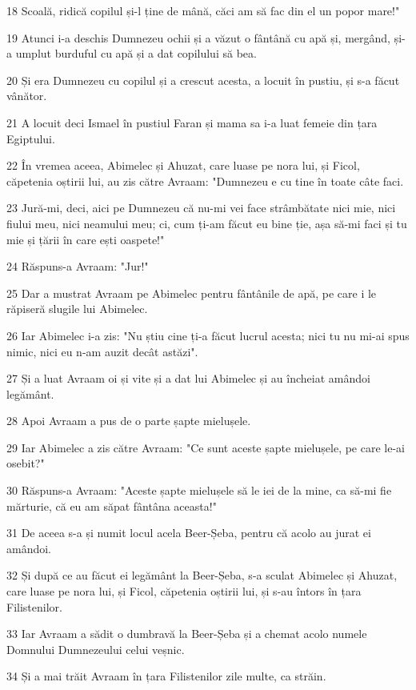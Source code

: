 \par 18 Scoală, ridică copilul și-l ține de mână, căci am să fac din el un popor mare!"
\par 19 Atunci i-a deschis Dumnezeu ochii și a văzut o fântână cu apă și, mergând, și-a umplut burduful cu apă și a dat copilului să bea.
\par 20 Și era Dumnezeu cu copilul și a crescut acesta, a locuit în pustiu, și s-a făcut vânător.
\par 21 A locuit deci Ismael în pustiul Faran și mama sa i-a luat femeie din țara Egiptului.
\par 22 În vremea aceea, Abimelec și Ahuzat, care luase pe nora lui, și Ficol, căpetenia oștirii lui, au zis către Avraam: "Dumnezeu e cu tine în toate câte faci.
\par 23 Jură-mi, deci, aici pe Dumnezeu că nu-mi vei face strâmbătate nici mie, nici fiului meu, nici neamului meu; ci, cum ți-am făcut eu bine ție, așa să-mi faci și tu mie și țării în care ești oaspete!"
\par 24 Răspuns-a Avraam: "Jur!"
\par 25 Dar a mustrat Avraam pe Abimelec pentru fântânile de apă, pe care i le răpiseră slugile lui Abimelec.
\par 26 Iar Abimelec i-a zis: "Nu știu cine ți-a făcut lucrul acesta; nici tu nu mi-ai spus nimic, nici eu n-am auzit decât astăzi".
\par 27 Și a luat Avraam oi și vite și a dat lui Abimelec și au încheiat amândoi legământ.
\par 28 Apoi Avraam a pus de o parte șapte mielușele.
\par 29 Iar Abimelec a zis către Avraam: "Ce sunt aceste șapte mielușele, pe care le-ai osebit?"
\par 30 Răspuns-a Avraam: "Aceste șapte mielușele să le iei de la mine, ca să-mi fie mărturie, că eu am săpat fântâna aceasta!"
\par 31 De aceea s-a și numit locul acela Beer-Șeba, pentru că acolo au jurat ei amândoi.
\par 32 Și după ce au făcut ei legământ la Beer-Șeba, s-a sculat Abimelec și Ahuzat, care luase pe nora lui, și Ficol, căpetenia oștirii lui, și s-au întors în țara Filistenilor.
\par 33 Iar Avraam a sădit o dumbravă la Beer-Șeba și a chemat acolo numele Domnului Dumnezeului celui veșnic.
\par 34 Și a mai trăit Avraam în țara Filistenilor zile multe, ca străin.

